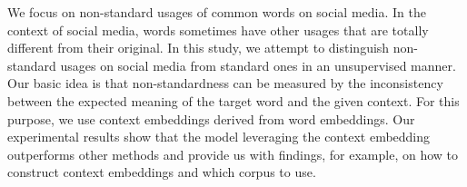 We focus on non-standard usages of common words on social media. In the context of social media, words sometimes have other usages that are totally different from their original. In this study, we attempt to distinguish non-standard usages on social media from standard ones in an unsupervised manner. Our basic idea is that non-standardness can be measured by the inconsistency between the expected meaning of the target word and the given context. For this purpose, we use context embeddings derived from word embeddings. Our experimental results show that the model leveraging the context embedding outperforms other methods and provide us with findings, for example, on how to construct context embeddings and which corpus to use.
